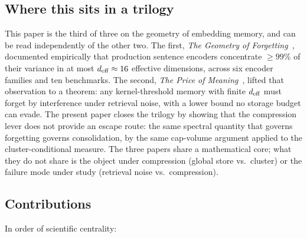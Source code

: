 \subsection{Where this sits in a trilogy}
\label{sec:intro:trilogy}

This paper is the third of three on the geometry of embedding
memory, and can be read independently of the other two. The first,
\emph{The Geometry of Forgetting}~\cite{geometryOfForgetting2026},
documented empirically that production sentence encoders concentrate
$\geq 99\%$ of their variance in at most ${d_{\mathrm{eff}}} \approx 16$ effective
dimensions, across six encoder families and ten benchmarks. The
second, \emph{The Price of Meaning}~\cite{priceOfMeaning2026}, lifted
that observation to a theorem: any kernel-threshold memory with
finite ${d_{\mathrm{eff}}}$ must forget by interference under retrieval noise,
with a lower bound no storage budget can evade. The present paper
closes the trilogy by showing that the compression lever does not
provide an escape route: the same spectral quantity that governs
forgetting governs consolidation, by the same cap-volume argument
applied to the cluster-conditional measure. The three papers share
a mathematical core; what they do not share is the object under
compression (global store vs.\ cluster) or the failure mode under
study (retrieval noise vs.\ compression).

\subsection{Contributions}
\label{sec:intro:contributions}

In order of scientific centrality:

